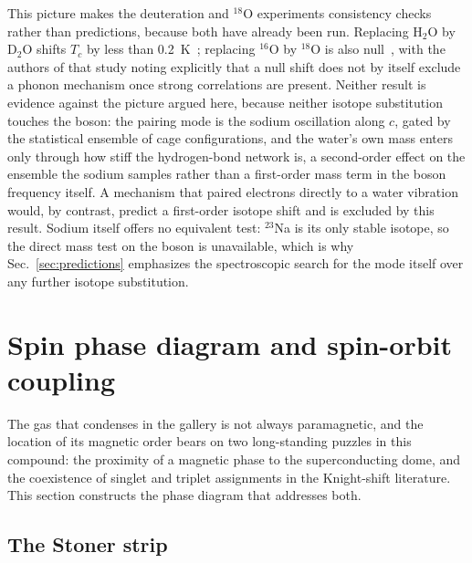 \documentclass[aps,10pt,preprint,superscriptaddress,floatfix]{revtex4-2}
\begin{document}
This picture makes the deuteration and $^{18}$O experiments consistency checks rather than
predictions, because both have already been run. Replacing H$_2$O by D$_2$O shifts $T_c$ by less
than 0.2~K~\cite{Jin2003}; replacing $^{16}$O by $^{18}$O is also null~\cite{Yokoi2008}, with the
authors of that study noting explicitly that a null shift does not by itself exclude a phonon
mechanism once strong correlations are present. Neither result is evidence against the picture
argued here, because neither isotope substitution touches the boson: the pairing mode is the sodium
oscillation along $c$, gated by the statistical ensemble of cage configurations, and the water's own
mass enters only through how stiff the hydrogen-bond network is, a second-order effect on the
ensemble the sodium samples rather than a first-order mass term in the boson frequency itself. A
mechanism that paired electrons directly to a water vibration would, by contrast, predict a
first-order isotope shift and is excluded by this result. Sodium itself offers no equivalent test:
$^{23}$Na is its only stable isotope, so the direct mass test on the boson is unavailable, which is
why Sec.~\ref{sec:predictions} emphasizes the spectroscopic search for the mode itself over any
further isotope substitution.

\FloatBarrier
\section{Spin phase diagram and spin-orbit coupling}
\label{sec:spin}

The gas that condenses in the gallery is not always paramagnetic, and the location of its magnetic
order bears on two long-standing puzzles in this compound: the proximity of a magnetic phase to the
superconducting dome, and the coexistence of singlet and triplet assignments in the Knight-shift
literature. This section constructs the phase diagram that addresses both.

\subsection{The Stoner strip}
\end{document}
